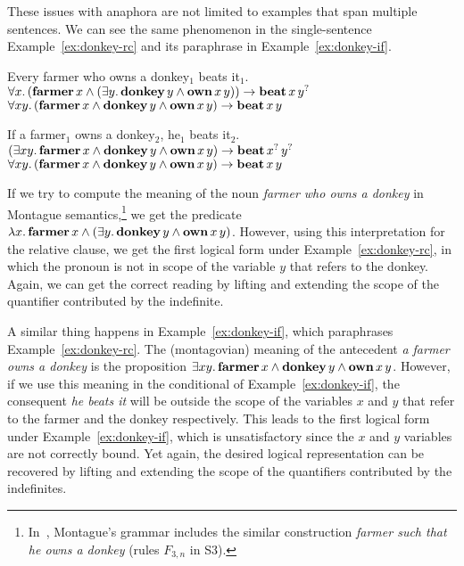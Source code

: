These issues with anaphora are not limited to examples that span multiple
sentences. We can see the same phenomenon in the single-sentence
Example~\ref{ex:donkey-rc} and its paraphrase in
Example~\ref{ex:donkey-if}.

\begin{exe}
  \ex Every farmer who owns a donkey$_1$ beats it$_1$. \label{ex:donkey-rc} \\
  $\forall x.\, (\textbf{farmer}\,x \land (\exists y.\,
  \textbf{donkey}\,y \land \textbf{own}\,x\,y)) \to
  \textbf{beat}\,x\,y^?$ \\
  $\forall x y.\, (\textbf{farmer}\,x \land \textbf{donkey}\,y \land
  \textbf{own}\,x\,y) \to \textbf{beat}\,x\,y$

  \ex If a farmer$_1$ owns a donkey$_2$, he$_1$ beats it$_2$. \label{ex:donkey-if} \\
  $(\exists x y.\, \textbf{farmer}\,x \land \textbf{donkey}\,y \land \textbf{own}\,x\,y) \to \textbf{beat}\,x^?\,y^?$ \\
  $\forall x y.\, (\textbf{farmer}\,x \land \textbf{donkey}\,y \land
  \textbf{own}\,x\,y) \to \textbf{beat}\,x\,y$
\end{exe}

If we try to compute the meaning of the noun \emph{farmer who owns a
  donkey} in Montague semantics,\footnote{In~\cite{montague1973proper},
  Montague's grammar includes the similar construction \emph{farmer such
    that he owns a donkey} (rules $F_{3,n}$ in S3).} we get the predicate
$\lambda x.\, \textbf{farmer}\,x \land (\exists y.\, \textbf{donkey}\,y
  \land \textbf{own}\,x\,y)$. However, using this interpretation for
the relative clause, we get the first logical form under
Example~\ref{ex:donkey-rc}, in which the pronoun is not in scope of the
variable $y$ that refers to the donkey. Again, we can get the correct
reading by lifting and extending the scope of the quantifier contributed by
the indefinite.

A similar thing happens in Example~\ref{ex:donkey-if}, which paraphrases
Example~\ref{ex:donkey-rc}. The (montagovian) meaning of the antecedent
\emph{a farmer owns a donkey} is the proposition
$\exists x y.\, \textbf{farmer}\,x \land \textbf{donkey}\,y \land
\textbf{own}\,x\,y$. However, if we use this meaning in the conditional
of Example~\ref{ex:donkey-if}, the consequent \emph{he beats it} will be
outside the scope of the variables $x$ and $y$ that refer to the farmer and
the donkey respectively. This leads to the first logical form under
Example~\ref{ex:donkey-if}, which is unsatisfactory since the $x$ and $y$
variables are not correctly bound. Yet again, the desired logical
representation can be recovered by lifting and extending the scope of the
quantifiers contributed by the indefinites.


